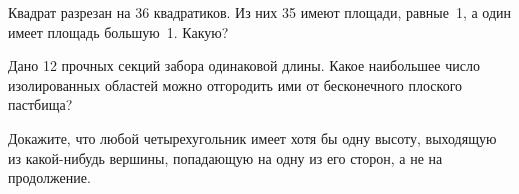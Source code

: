 ﻿
\begin{itemize}

\itA Квадрат разрезан на 36 квадратиков. Из них 35 имеют площади, равные~1, а один имеет площадь большую~1. Какую?

\itB Дано 12 прочных секций забора одинаковой длины. Какое наибольшее число изолированных областей можно отгородить ими от бесконечного плоского пастбища?

\itC Докажите, что любой четырехугольник имеет хотя бы одну высоту, выходящую из какой-нибудь вершины, попадающую на одну из его сторон, а не на продолжение.
\end{itemize}